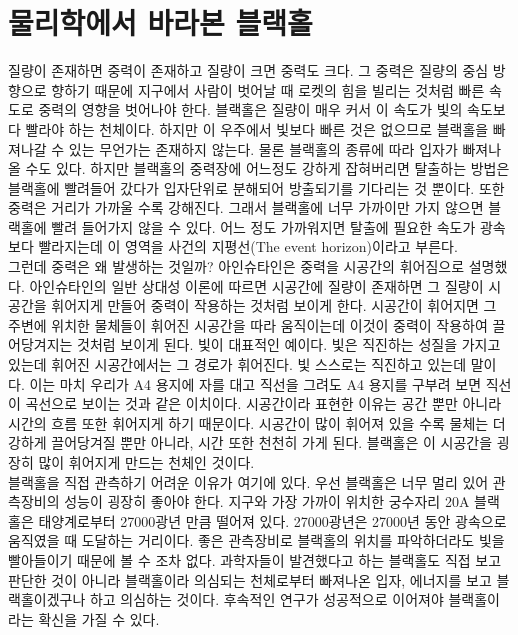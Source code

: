 \documentclass[
    aps,
    reprint,
    superscriptaddress,
    ]{revtex4-2}
\begin{document}
\section{물리학에서 바라본 블랙홀}
질량이 존재하면 중력이 존재하고 질량이 크면 중력도 크다. 그 중력은 질량의 중심 방향으로 향하기 때문에 
지구에서 사람이 벗어날 때 로켓의 힘을 빌리는 것처럼 빠른 속도로 중력의 영향을 벗어나야 한다. 
블랙홀은 질량이 매우 커서 이 속도가 빛의 속도보다 빨라야 하는 천체이다. 하지만 이 우주에서 빛보다 빠른 
것은 없으므로 블랙홀을 빠져나갈 수 있는 무언가는 존재하지 않는다. 물론 블랙홀의 종류에 따라 입자가 빠져나올
수도 있다. 하지만 블랙홀의 중력장에 어느정도 강하게 잡혀버리면 탈출하는 방법은 블랙홀에 빨려들어 갔다가
입자단위로 분해되어 방출되기를 기다리는 것 뿐이다.
또한 중력은 거리가 가까울 수록 강해진다. 그래서 블랙홀에 너무 가까이만 가지 않으면 블랙홀에 빨려 들어가지
않을 수 있다. 어느 정도 가까워지면 탈출에 필요한 속도가 광속보다 빨라지는데 이 영역을 사건의 지평선(The
event horizon)이라고 부른다. \\
그런데 중력은 왜 발생하는 것일까? 아인슈타인은 중력을 시공간의 휘어짐으로 설명했다. 
아인슈타인의 일반 상대성 이론에 따르면 시공간에 질량이 존재하면 그 질량이 시공간을 휘어지게 만들어 
중력이 작용하는 것처럼 보이게 한다. 시공간이 휘어지면 그 주변에 위치한 물체들이 휘어진 시공간을 
따라 움직이는데 이것이 중력이 작용하여 끌어당겨지는 것처럼 보이게 된다. 빛이 대표적인 예이다. 
빛은 직진하는 성질을 가지고 있는데 휘어진 시공간에서는 그 경로가 휘어진다. 빛 스스로는 직진하고 
있는데 말이다. 이는 마치 우리가 A4 용지에 자를 대고 직선을 그려도 A4 용지를 구부려 보면 직선이 
곡선으로 보이는 것과 같은 이치이다.
시공간이라 표현한 이유는 공간 뿐만 아니라 시간의 흐름 또한 휘어지게 하기 때문이다. 
시공간이 많이 휘어져 있을 수록 물체는 더 강하게 끌어당겨질 뿐만 아니라, 시간 또한 천천히
가게 된다. 블랙홀은 이 시공간을 굉장히 많이 휘어지게 만드는 천체인 것이다.  \\
블랙홀을 직접 관측하기 어려운 이유가 여기에 있다. 우선 블랙홀은 너무 멀리 있어 관측장비의 성능이 
굉장히 좋아야 한다. 지구와 가장 가까이 위치한 궁수자리 20A 블랙홀은 태양계로부터 
27000광년 만큼 떨어져 있다. 27000광년은 27000년 동안 광속으로 움직였을 때 도달하는 거리이다.
좋은 관측장비로 블랙홀의 위치를 파악하더라도 빛을 빨아들이기 때문에 볼 수 조차 없다.
과학자들이 발견했다고 하는 블랙홀도 직접 보고 판단한 것이 아니라 블랙홀이라 의심되는 천체로부터 
빠져나온 입자, 에너지를 보고 블랙홀이겠구나 하고 의심하는 것이다. 후속적인 연구가 성공적으로 
이어져야 블랙홀이라는 확신을 가질 수 있다.
\end{document}
